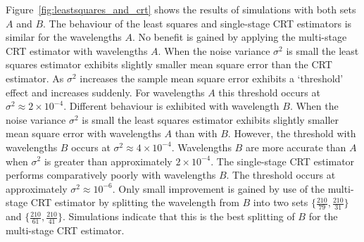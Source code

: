 \documentclass[10pt,twocolumn,twoside]{IEEEtran}
\begin{document}
Figure~\ref{fig:leastsquares_and_crt} shows the results of simulations with both sets $A$ and $B$.  The behaviour of the least squares and single-stage CRT estimators is similar for the wavelengths $A$.  No benefit is gained by applying the multi-stage CRT estimator with wavelengths $A$.  When the noise variance $\sigma^2$ is small the least squares estimator exhibits slightly smaller mean square error than the CRT estimator.  As $\sigma^2$ increases the sample mean square error exhibits a `threshold' effect and increases suddenly.  For wavelengths $A$ this threshold occurs at $\sigma^2 \approx 2 \times 10^{-4}$.  Different behaviour is exhibited with wavelength $B$.  When the noise variance $\sigma^2$ is small the least squares estimator exhibits slightly smaller mean square error with wavelengths $A$ than with $B$.  However, the threshold with wavelengths $B$ occurs at $\sigma^2 \approx 4\times 10^{-4}$.  Wavelengths $B$ are more accurate than $A$ when $\sigma^2$ is greater than approximately $2\times 10^{-4}$.  The single-stage CRT estimator performs comparatively poorly with wavelengths $B$.  The threshold occurs at approximately $\sigma^2 \approx 10^{-6}$.  Only small improvement is gained by use of the multi-stage CRT estimator by splitting the wavelength from $B$ into two sets $\{\tfrac{210}{79}, \tfrac{210}{31}\}$ and $\{\tfrac{210}{61}, \tfrac{210}{41}\}$.  Simulations indicate that this is the best splitting of $B$ for the multi-stage CRT estimator.


\end{document}
